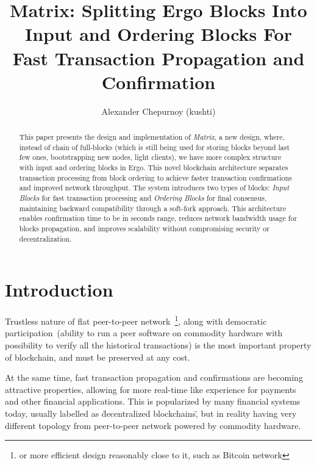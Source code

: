 \documentclass{llncs}
\newcommand{\protname}{\textsf{Matrix}}
\begin{document}
\title{\protname{}: Splitting Ergo Blocks Into Input and Ordering Blocks For Fast Transaction Propagation and Confirmation}

\author{Alexander Chepurnoy (kushti)}

\maketitle

\begin{abstract}
This paper presents the design and implementation of \emph{Matrix}, a new design, where, instead of chain of full-blocks (which is still
being used for storing blocks beyond last few ones, bootstrapping new nodes, light clients), we have more complex structure with input and ordering blocks in Ergo.
This novel blockchain architecture separates transaction processing from block ordering to achieve faster transaction confirmations and improved
network throughput. The system introduces two types of blocks: \emph{Input Blocks} for fast transaction processing
and \emph{Ordering Blocks} for final consensus, maintaining backward compatibility through a soft-fork approach.
This architecture enables confirmation time to be in seconds range, reduces network bandwidth usage for blocks propagation, and improves scalability
without compromising security or decentralization.
\end{abstract}


\section{Introduction}
\label{sec:introduction}

Trustless nature of flat peer-to-peer network~\footnote{or more efficient design reasonably close to it, such as Bitcoin network}, along
with democratic participation~(ability to run a peer software on commodity hardware with possibility to verify all the historical transactions)
is the most important property of blockchain, and must be preserved at any cost.

At the same time, fast transaction propagation and confirmations are becoming attractive properties, allowing for more
real-time like experience for payments and other financial applications. This is popularized by many financial systems
today, usually labelled as \"decentralized blockchains\", but in reality having very different topology from peer-to-peer
network powered by commodity hardware.
\end{document}
